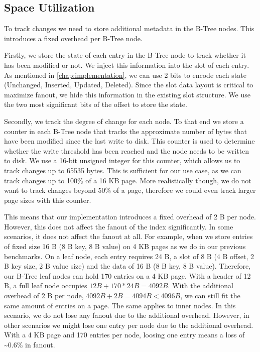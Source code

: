\subsection{Space Utilization}
\label{sec:space_overhead}
To track changes we need to store additional metadata in the B-Tree nodes.
This introduces a fixed overhead per B-Tree node.

Firstly, we store the state of each entry in the B-Tree node to track whether it has been modified or not.
We inject this information into the slot of each entry.
As mentioned in \autoref{chap:implementation}, we can use 2 bits to encode each state (Unchanged, Inserted, Updated, Deleted).
Since the slot data layout is critical to maximize fanout, we hide this information in the existing slot structure.
We use the two most significant bits of the offset to store the state.

Secondly, we track the degree of change for each node.
To that end we store a counter in each B-Tree node that tracks the approximate number of bytes that have been modified since the last write to disk.
This counter is used to determine whether the write threshold has been reached and the node needs to be written to disk.
We use a 16-bit unsigned integer for this counter, which allows us to track changes up to 65535 bytes.
This is sufficient for our use case, as we can track changes up to 100\% of a 16 KB page.
More realistically though, we do not want to track changes beyond 50\% of a page, therefore we could even track larger page sizes with this counter.

This means that our implementation introduces a fixed overhead of 2 B per node.
However, this does not affect the fanout of the index significantly.
In some scenarios, it does not affect the fanout at all.
For example, when we store entries of fixed size 16 B (8 B key, 8 B value) on 4 KB pages as we do in our previous benchmarks.
On a leaf node, each entry requires 24 B, a slot of 8 B (4 B offset, 2 B key size, 2 B value size) and the data of 16 B (8 B key, 8 B value).
Therefore, our B-Tree leaf nodes can hold 170 entries on a 4 KB page.
With a header of 12 B, a full leaf node occupies $12 B + 170 * 24 B = 4092 B$.
With the additional overhead of 2 B per node, $ 4092 B + 2 B = 4094 B < 4096 B$, we can still fit the same amount of entries on a page.
The same applies to inner nodes.
In this scenario, we do not lose any fanout due to the additional overhead.
However, in other scenarios we might lose one entry per node due to the additional overhead.
With a 4 KB page and 170 entries per node, loosing one entry means a loss of \textasciitilde0.6\% in fanout.

